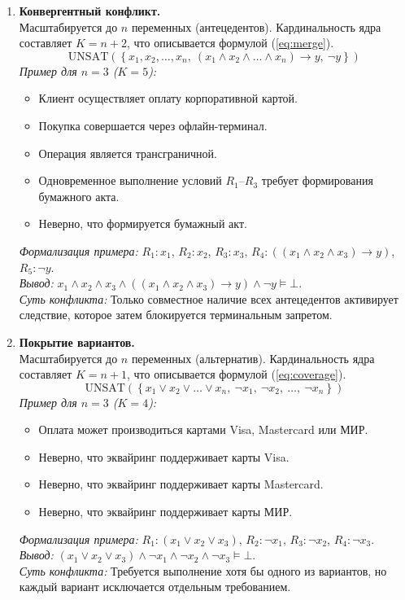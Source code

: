 \begin{enumerate}
\item \textbf{Конвергентный конфликт.} \\
Масштабируется до $n$ переменных (антецедентов). Кардинальность ядра составляет $K=n+2$, что описывается формулой (\ref{eq:merge}).
\begin{equation} \label{eq:merge}
\text{UNSAT}\left( \left\{ x_1, x_2, \dots, x_n,\ (x_1 \land x_2 \land \dots \land x_n) \rightarrow y,\ \neg y \right\} \right)
\end{equation}
\textit{Пример для $n=3$ ($K=5$):}
\begin{itemize}
    \item [$R_1$:] Клиент осуществляет оплату корпоративной картой.
    \item [$R_2$:] Покупка совершается через офлайн-терминал.
    \item [$R_3$:] Операция является трансграничной.
    \item [$R_4$:] Одновременное выполнение условий $R_1$–$R_3$ требует формирования бумажного акта.
    \item [$R_5$:] Неверно, что формируется бумажный акт.
\end{itemize}
\textit{Формализация примера:} $R_1: x_1$, $R_2: x_2$, $R_3: x_3$, $R_4: ((x_1 \land x_2 \land x_3) \rightarrow y)$, $R_5: \neg y$. \\
\textit{Вывод:} $x_1 \land x_2 \land x_3 \land ((x_1 \land x_2 \land x_3) \rightarrow y) \land \neg y \models \bot$. \\
\textit{Суть конфликта:} Только совместное наличие всех антецедентов активирует следствие, которое затем блокируется терминальным запретом.

\item \textbf{Покрытие вариантов.} \\
Масштабируется до $n$ переменных (альтернатив). Кардинальность ядра составляет $K=n+1$, что описывается формулой (\ref{eq:coverage}).
\begin{equation} \label{eq:coverage}
\text{UNSAT}\left( \left\{ x_1 \lor x_2 \lor \dots \lor x_n,\ \neg x_1,\ \neg x_2,\ \dots,\ \neg x_n \right\} \right)
\end{equation}
\textit{Пример для $n=3$ ($K=4$):}
\begin{itemize}
    \item [$R_1$:] Оплата может производиться картами Visa, Mastercard или МИР.
    \item [$R_2$:] Неверно, что эквайринг поддерживает карты Visa.
    \item [$R_3$:] Неверно, что эквайринг поддерживает карты Mastercard.
    \item [$R_4$:] Неверно, что эквайринг поддерживает карты МИР.
\end{itemize}
\textit{Формализация примера:} $R_1: (x_1 \lor x_2 \lor x_3)$, $R_2: \neg x_1$, $R_3: \neg x_2$, $R_4: \neg x_3$. \\
\textit{Вывод:} $(x_1 \lor x_2 \lor x_3) \land \neg x_1 \land \neg x_2 \land \neg x_3 \models \bot$. \\
\textit{Суть конфликта:} Требуется выполнение хотя бы одного из вариантов, но каждый вариант исключается отдельным требованием.


\end{enumerate}
